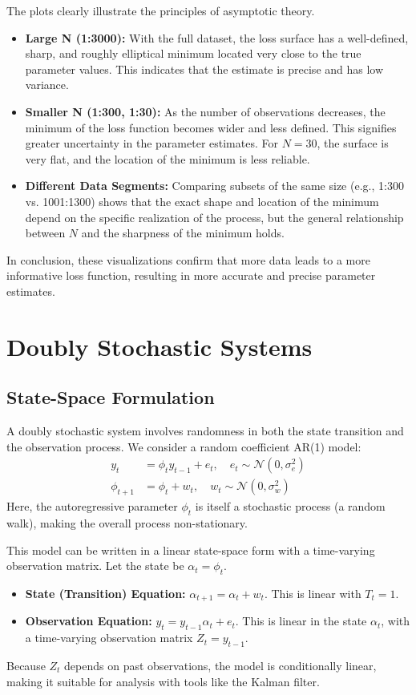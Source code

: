 \documentclass[11pt, a4paper]{article}
\begin{document}
The plots clearly illustrate the principles of asymptotic theory.
\begin{itemize}
    \item \textbf{Large N (1:3000):} With the full dataset, the loss surface has a well-defined, sharp, and roughly elliptical minimum located very close to the true parameter values. This indicates that the estimate is precise and has low variance.
    \item \textbf{Smaller N (1:300, 1:30):} As the number of observations decreases, the minimum of the loss function becomes wider and less defined. This signifies greater uncertainty in the parameter estimates. For $N=30$, the surface is very flat, and the location of the minimum is less reliable.
    \item \textbf{Different Data Segments:} Comparing subsets of the same size (e.g., 1:300 vs. 1001:1300) shows that the exact shape and location of the minimum depend on the specific realization of the process, but the general relationship between $N$ and the sharpness of the minimum holds.
\end{itemize}
In conclusion, these visualizations confirm that more data leads to a more informative loss function, resulting in more accurate and precise parameter estimates.

\section{Doubly Stochastic Systems}
\subsection{State-Space Formulation}
A doubly stochastic system involves randomness in both the state transition and the observation process. We consider a random coefficient AR(1) model:
\begin{align}
    y_t &= \phi_t y_{t-1} + e_t, \quad e_t \sim \mathcal{N}(0, \sigma_e^2) \\
    \phi_{t+1} &= \phi_t + w_t, \quad w_t \sim \mathcal{N}(0, \sigma_w^2)
\end{align}
Here, the autoregressive parameter $\phi_t$ is itself a stochastic process (a random walk), making the overall process non-stationary.

This model can be written in a linear state-space form with a time-varying observation matrix. Let the state be $\alpha_t = \phi_t$.
\begin{itemize}
    \item \textbf{State (Transition) Equation:} $\alpha_{t+1} = \alpha_t + w_t$. This is linear with $T_t=1$.
    \item \textbf{Observation Equation:} $y_t = y_{t-1} \alpha_t + e_t$. This is linear in the state $\alpha_t$, with a time-varying observation matrix $Z_t = y_{t-1}$.
\end{itemize}
Because $Z_t$ depends on past observations, the model is conditionally linear, making it suitable for analysis with tools like the Kalman filter.
\end{document}
